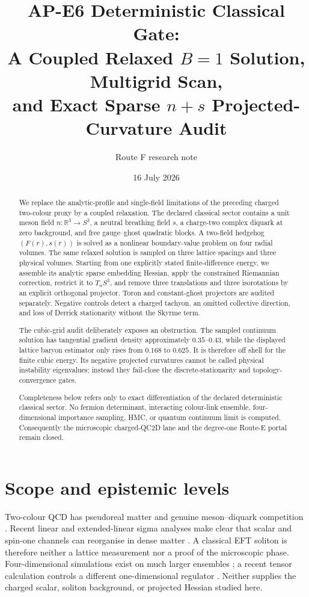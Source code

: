 \documentclass[11pt]{article}
\title{AP-E6 Deterministic Classical Gate:\\
A Coupled Relaxed \(B=1\) Solution, Multigrid Scan,\\
and Exact Sparse \(n+s\) Projected-Curvature Audit}
\author{Route F research note}
\date{16 July 2026}
\theoremstyle{definition}
\theoremstyle{remark}
\newcommand{\RR}{\mathbb R}
\begin{document}
\maketitle

\begin{abstract}
We replace the analytic-profile and single-field limitations of the preceding
charged two-colour proxy by a coupled relaxation.  The declared classical
sector contains a unit meson field \(n:\RR^3\to S^3\), a neutral breathing
field \(s\), a charge-two complex diquark at zero background, and free
gauge--ghost quadratic blocks.  A two-field hedgehog \((F(r),s(r))\) is solved
as a nonlinear boundary-value problem on four radial volumes.  The same
relaxed solution is sampled on three lattice spacings and three physical
volumes.  Starting from one explicitly stated finite-difference energy, we
assemble its analytic sparse embedding Hessian, apply the constrained
Riemannian correction, restrict it to \(T_nS^3\), and remove three translations
and three isorotations by an explicit orthogonal projector.  Toron and
constant-ghost projectors are audited separately.  Negative controls detect
a charged tachyon, an omitted collective direction, and loss of Derrick
stationarity without the Skyrme term.

The cubic-grid audit deliberately exposes an obstruction.  The sampled
continuum solution has tangential gradient density approximately
\(0.35\)--\(0.43\), while the displayed lattice baryon estimator only rises
from \(0.168\) to \(0.625\).  It is therefore off shell for the finite cubic
energy.  Its negative projected curvatures cannot be called physical
instability eigenvalues; instead they fail-close the discrete-stationarity
and topology-convergence gates.

Completeness below refers only to exact differentiation of the declared
deterministic classical sector.  No fermion determinant, interacting
colour-link ensemble, four-dimensional importance sampling, HMC, or quantum
continuum limit is computed.  Consequently the microscopic charged-QC2D lane
and the degree-one Route-E portal remain closed.
\end{abstract}

\tableofcontents

\section{Scope and epistemic levels}

Two-colour QCD has pseudoreal matter and genuine meson--diquark competition
\cite{KogutEtAl2000APE6}.  Recent linear and extended-linear sigma analyses
make clear that scalar and spin-one channels can reorganise in dense matter
\cite{SuenagaEtAl2023APE6,SuenagaEtAl2024APE6}.  A classical EFT soliton is
therefore neither a lattice measurement nor a proof of the microscopic phase.
Four-dimensional simulations exist on much larger ensembles
\cite{BegunEtAl2022APE6}; a recent tensor calculation controls a different
one-dimensional regulator \cite{PaiAkiyamaTodo2025APE6}.  Neither supplies the
charged scalar, soliton background, or projected Hessian studied here.
\end{document}
